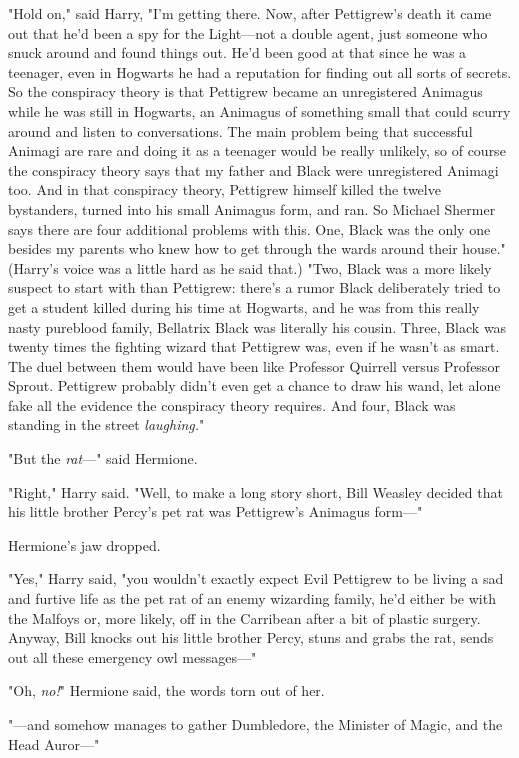 "Hold on," said Harry, "I'm getting there. Now, after Pettigrew's death it came
out that he'd been a spy for the Light---not a double agent, just someone who
snuck around and found things out. He'd been good at that since he was a
teenager, even in Hogwarts he had a reputation for finding out all sorts of
secrets. So the conspiracy theory is that Pettigrew became an unregistered
Animagus while he was still in Hogwarts, an Animagus of something small that
could scurry around and listen to conversations. The main problem being that
successful Animagi are rare and doing it as a teenager would be really
unlikely, so of course the conspiracy theory says that my father and Black were
unregistered Animagi too. And in that conspiracy theory, Pettigrew himself
killed the twelve bystanders, turned into his small Animagus form, and ran. So
Michael Shermer says there are four additional problems with this. One, Black
was the only one besides my parents who knew how to get through the wards
around their house." (Harry's voice was a little hard as he said that.) "Two,
Black was a more likely suspect to start with than Pettigrew: there's a rumor
Black deliberately tried to get a student killed during his time at Hogwarts,
and he was from this really nasty pureblood family, Bellatrix Black was
literally his cousin. Three, Black was twenty times the fighting wizard that
Pettigrew was, even if he wasn't as smart. The duel between them would have
been like Professor Quirrell versus Professor Sprout. Pettigrew probably didn't
even get a chance to draw his wand, let alone fake all the evidence the
conspiracy theory requires. And four, Black was standing in the street
\emph{laughing.}"

"But the \emph{rat}---" said Hermione.

"Right," Harry said. "Well, to make a long story short, Bill Weasley decided
that his little brother Percy's pet rat was Pettigrew's Animagus form---"

Hermione's jaw dropped.

"Yes," Harry said, "you wouldn't exactly expect Evil Pettigrew to be living a
sad and furtive life as the pet rat of an enemy wizarding family, he'd either
be with the Malfoys or, more likely, off in the Carribean after a bit of
plastic surgery. Anyway, Bill knocks out his little brother Percy, stuns and
grabs the rat, sends out all these emergency owl messages---"

"Oh, \emph{no!}" Hermione said, the words torn out of her.

"---and somehow manages to gather Dumbledore, the Minister of Magic, and the
Head Auror---"

